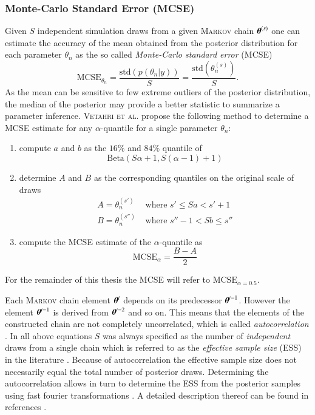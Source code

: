 \subsubsection{Monte-Carlo Standard Error (MCSE)}
Given $S$ independent simulation draws from a given \textsc{Markov} chain $\boldsymbol{\theta}^{(s)}$ one can estimate the accuracy of the mean obtained from the posterior distribution for each parameter $\theta_n$ as the so called \emph{Monte-Carlo standard error} (MCSE) 
\begin{equation}
	\text{MCSE}_{\theta_n}=\frac{\text{std}(p(\theta_n|y))}{S}=\frac{\text{std}(\theta_n^{(s)})}{S}.
\end{equation}
As the mean can be sensitive to few extreme outliers of the posterior distribution, the median of the posterior may provide a better statistic to summarize a parameter inference. \textsc{Vetahri et al.} \cite{rhat} propose the following method to determine a MCSE estimate for any $\alpha$-quantile for a single parameter $\theta_n$:
\begin{enumerate}
	\item compute $a$ and $b$ as the $16\%$ and $84\%$ quantile of 
	\begin{equation}
		\text{Beta}(S\alpha+1,S(\alpha-1)+1)
	\end{equation}
	\item determine $A$ and $B$ as the corresponding quantiles on the original scale of draws
	\begin{align}
		A=\theta_n^{(s')} &\text{ where } s'\leq Sa < s'+1 \\
		B=\theta_n^ {(s'')} &\text{ where } s''-1< Sb\leq s'' 
	\end{align}
	\item compute the MCSE estimate of the $\alpha$-quantile as
	\begin{equation}
		\text{MCSE}_{\alpha}=\frac{B-A}{2}
	\end{equation}
\end{enumerate}
For the remainder of this thesis the MCSE will refer to $\text{MCSE}_{\alpha=0.5}$.

Each \textsc{Markov} chain element $\boldsymbol{\theta}^t$ depends on its predecessor $\boldsymbol{\theta}^{t-1}$. However the element $\boldsymbol{\theta}^{t-1}$ is derived from $\boldsymbol{\theta}^{t-2}$ and so on. This means that the elements of the constructed chain are not completely uncorrelated, which is called \emph{autocorrelation} \cite{bayes}. In all above equations $S$ was always specified as the number of \emph{independent} draws from a single chain which is referred to as the \emph{effective sample size} (ESS) in the literature \cite{bayes,rhat}. Because of autocorrelation the effective sample size does not necessarily equal the total number of posterior draws. Determining the autocorrelation allows in turn to determine the ESS from the posterior samples using fast fourier transformations \cite{gey1,gey2}. A detailed description thereof can be found in references \cite{stan,bayes}.

